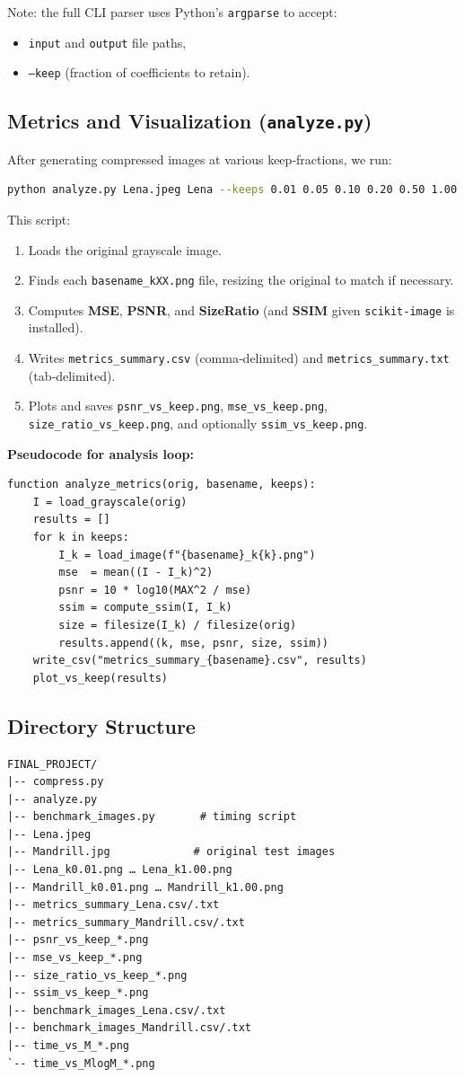 \documentclass[12pt]{article}
\begin{document}
\noindent Note: the full CLI parser uses Python’s \texttt{argparse} to accept:
\begin{itemize}
  \item \texttt{input} and \texttt{output} file paths,
  \item \texttt{--keep} (fraction of coefficients to retain).
\end{itemize}

\subsection{Metrics and Visualization (\texttt{analyze.py})}
After generating compressed images at various keep‐fractions, we run:
\begin{lstlisting}[language=bash]
python analyze.py Lena.jpeg Lena --keeps 0.01 0.05 0.10 0.20 0.50 1.00
\end{lstlisting}
This script:
\begin{enumerate}
  \item Loads the original grayscale image.
  \item Finds each \texttt{basename\_kXX.png} file, resizing the original to match if necessary.
  \item Computes \textbf{MSE}, \textbf{PSNR}, and \textbf{SizeRatio} (and \textbf{SSIM} given \texttt{scikit-image} is installed).
  \item Writes \texttt{metrics\_summary.csv} (comma‐delimited) and \texttt{metrics\_summary.txt} (tab‐delimited).
  \item Plots and saves \texttt{psnr\_vs\_keep.png}, \texttt{mse\_vs\_keep.png}, \texttt{size\_ratio\_vs\_keep.png}, and optionally \texttt{ssim\_vs\_keep.png}.
\end{enumerate}

\textbf{Pseudocode for analysis loop:}
\begin{verbatim}
function analyze_metrics(orig, basename, keeps):
    I = load_grayscale(orig)
    results = []
    for k in keeps:
        I_k = load_image(f"{basename}_k{k}.png")
        mse  = mean((I - I_k)^2)
        psnr = 10 * log10(MAX^2 / mse)
        ssim = compute_ssim(I, I_k)
        size = filesize(I_k) / filesize(orig)
        results.append((k, mse, psnr, size, ssim))
    write_csv("metrics_summary_{basename}.csv", results)
    plot_vs_keep(results)
\end{verbatim}

\subsection{ Directory Structure}
\begin{verbatim}
FINAL_PROJECT/
|-- compress.py
|-- analyze.py
|-- benchmark_images.py       # timing script
|-- Lena.jpeg
|-- Mandrill.jpg             # original test images
|-- Lena_k0.01.png … Lena_k1.00.png
|-- Mandrill_k0.01.png … Mandrill_k1.00.png
|-- metrics_summary_Lena.csv/.txt
|-- metrics_summary_Mandrill.csv/.txt
|-- psnr_vs_keep_*.png
|-- mse_vs_keep_*.png
|-- size_ratio_vs_keep_*.png
|-- ssim_vs_keep_*.png
|-- benchmark_images_Lena.csv/.txt
|-- benchmark_images_Mandrill.csv/.txt
|-- time_vs_M_*.png
`-- time_vs_MlogM_*.png
\end{verbatim}
\end{document}
